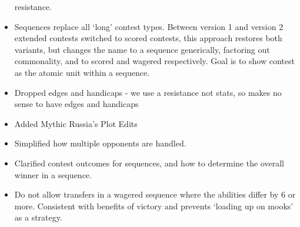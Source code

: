 \documentclass[
  11pt,
]{article}
\begin{document}
\begin{itemize}
  resistance.
\item
  Sequences replace all `long' contest types. Between version 1 and
  version 2 extended contests switched to scored contests, this approach
  restores both variants, but changes the name to a sequence
  generically, factoring out commonality, and to scored and wagered
  respectively. Goal is to show contest as the atomic unit within a
  sequence.
\item
  Dropped edges and handicaps - we use a resistance not stats, so makes
  no sense to have edges and handicaps
\item
  Added Mythic Russia's Plot Edits
\item
  Simplified how multiple opponents are handled.
\item
  Clarified contest outcomes for sequences, and how to determine the
  overall winner in a sequence.
\item
  Do not allow transfers in a wagered sequence where the abilities
  differ by 6 or more. Consistent with benefits of victory and prevents
  `loading up on mooks' as a strategy.
\end{itemize}
\end{document}
